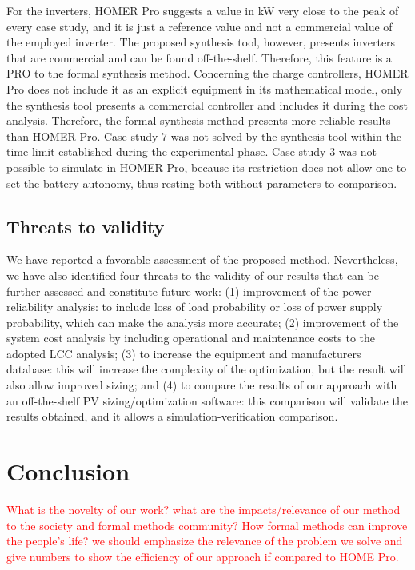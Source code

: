 \documentclass[runningheads]{llncs}
\begin{document}
For the inverters, HOMER Pro suggests a value in kW very close to the peak of every case study, and it is just a reference value and not a commercial value of the employed inverter. The proposed synthesis tool, however, presents inverters that are commercial and can be found off-the-shelf. Therefore, this feature is a PRO to the formal synthesis method. Concerning the charge controllers, HOMER Pro does not include it as an explicit equipment in its mathematical model, only the synthesis tool presents a commercial controller and includes it during the cost analysis. Therefore, the formal synthesis method presents more reliable results than HOMER Pro. Case study $7$ was not solved by the synthesis tool within the time limit established during the experimental phase. Case study $3$ was not possible to simulate in HOMER Pro, because its restriction does not allow one to set the battery autonomy, thus resting both without parameters to comparison.

\subsection{Threats to validity} 

We have reported a favorable assessment of the proposed method. Nevertheless, we have also identified four threats to the validity of our results that can be further assessed and constitute future work: (1) improvement of the power reliability analysis: to include loss of load probability or loss of power supply probability, which can make the analysis more accurate; (2) improvement of the system cost analysis by including operational and maintenance costs to the adopted LCC analysis; (3) to increase the equipment and manufacturers database: this will increase the complexity of the optimization, but the result will also allow improved sizing; and (4) to compare the results of our approach with an off-the-shelf PV sizing/optimization software: this comparison will validate the results obtained, and it allows a simulation-verification comparison.

\section{Conclusion} 

\textcolor{red}{What is the novelty of our work? what are the impacts/relevance of our method to the society and formal methods community? How formal methods can improve the people's life? we should emphasize the relevance of the problem we solve and give numbers to show the efficiency of our approach if compared to HOME Pro.}
\end{document}
